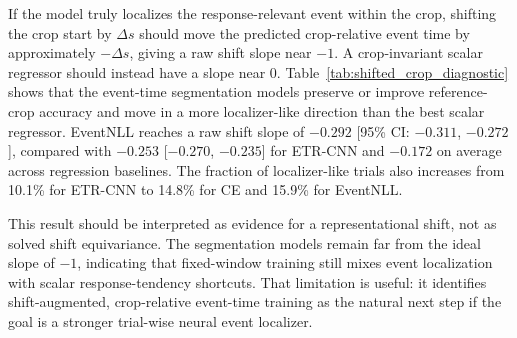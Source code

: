 \documentclass[12pt]{article}
\begin{document}
If the model truly localizes the response-relevant event within the crop, shifting the crop start by $\Delta s$ should move the predicted crop-relative event time by approximately $-\Delta s$, giving a raw shift slope near $-1$. A crop-invariant scalar regressor should instead have a slope near 0. Table~\ref{tab:shifted_crop_diagnostic} shows that the event-time segmentation models preserve or improve reference-crop accuracy and move in a more localizer-like direction than the best scalar regressor. EventNLL reaches a raw shift slope of $-0.292$ [95\% CI: $-0.311$, $-0.272$], compared with $-0.253$ [$-0.270$, $-0.235$] for ETR-CNN and $-0.172$ on average across regression baselines. The fraction of localizer-like trials also increases from 10.1\% for ETR-CNN to 14.8\% for CE and 15.9\% for EventNLL.

This result should be interpreted as evidence for a representational shift, not as solved shift equivariance. The segmentation models remain far from the ideal slope of $-1$, indicating that fixed-window training still mixes event localization with scalar response-tendency shortcuts. That limitation is useful: it identifies shift-augmented, crop-relative event-time training as the natural next step if the goal is a stronger trial-wise neural event localizer.

\begin{table}[!t]
\centering
\caption{Shifted-crop diagnostic on the R11 common-inside subset. The ideal within-crop event localizer has raw shift slope $-1$; a crop-invariant scalar shortcut has slope 0. Reference nRMSE is computed at the standard $s=0.5$~s crop.}
\label{tab:shifted_crop_diagnostic}
\scriptsize
\setlength{\tabcolsep}{3pt}
\renewcommand{\arraystretch}{1.12}
\end{table}
\end{document}
